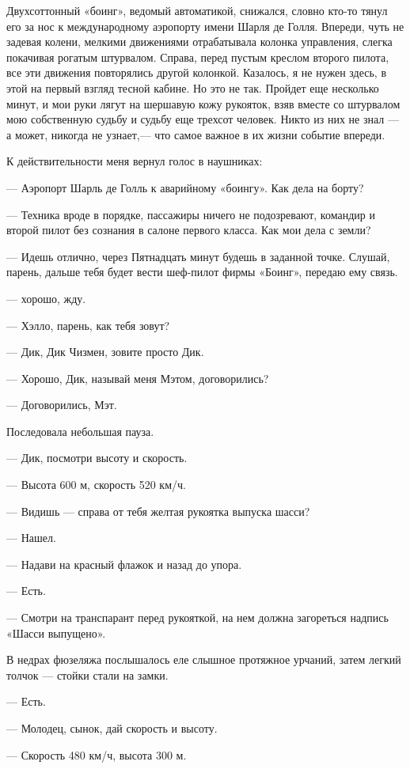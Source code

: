 \documentclass[11pt,a4paper,oneside]{article}
\begin{document}
Двухсоттонный «боинг», ведомый автоматикой, снижался, словно кто-то тянул его за нос к международному аэропорту имени Шарля де Голля. Впереди, чуть не задевая колени, мелкими движениями отрабатывала колонка управления, слегка покачивая рогатым штурвалом. Справа, перед пустым креслом второго пилота, все эти движения повторялись другой колонкой. Казалось, я не нужен здесь, в этой на первый взгляд тесной кабине. Но это не так. Пройдет еще несколько минут, и мои руки лягут на шершавую кожу рукояток, взяв вместе со штурвалом мою собственную судьбу и судьбу еще трехсот человек. Никто из них не знал — а может, никогда не узнает,— что самое важное в их жизни событие впереди.

К действительности меня вернул голос в наушниках:

— Аэропорт Шарль де Голль к аварийному «боингу». Как дела на борту?

— Техника вроде в порядке, пассажиры ничего не подозревают, командир и второй пилот без сознания в салоне первого класса. Как мои дела с земли?

— Идешь отлично, через Пятнадцать минут будешь в заданной точке. Слушай, парень, дальше тебя будет вести шеф-пилот фирмы «Боинг», передаю ему связь.

— хорошо, жду.

— Хэлло, парень, как тебя зовут?

— Дик, Дик Чизмен, зовите просто Дик.

— Хорошо, Дик, называй меня Мэтом, договорились?

— Договорились, Мэт.

Последовала небольшая пауза.

— Дик, посмотри высоту и скорость.

— Высота 600 м, скорость 520 км/ч.

— Видишь — справа от тебя желтая рукоятка выпуска шасси?

— Нашел.

— Надави на красный флажок и назад до упора.

— Есть.

— Смотри на транспарант перед рукояткой, на нем должна загореться надпись «Шасси выпущено».

В недрах фюзеляжа послышалось еле слышное протяжное урчаний, затем легкий толчок — стойки стали на замки.

— Есть.

— Молодец, сынок, дай скорость и высоту.

— Скорость 480 км/ч, высота 300 м.
\end{document}
